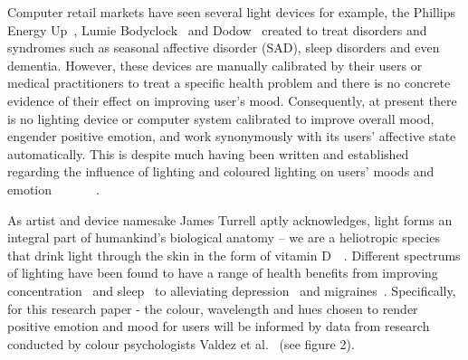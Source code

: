 \documentclass{sigchi}
\begin{document}
Computer retail markets have seen several light devices for example, the Phillips Energy Up~\cite{Phillips01}, Lumie Bodyclock~\cite{Lumie01} and Dodow~\cite{Dodow01} created to treat disorders and syndromes such as seasonal affective disorder (SAD), sleep disorders and even dementia. However, these devices are manually calibrated by their users or medical practitioners to treat a specific health problem and there is no concrete evidence of their effect on improving user’s mood. Consequently, at present there is no lighting device or computer system calibrated to improve overall mood, engender positive emotion, and work synonymously with its users’ affective state automatically. This is despite much having been written and established regarding the influence of lighting and coloured lighting on users’ moods and emotion~\cite{baron1992effects}~\cite{han2017effects}~\cite{jo2014smart}~\cite{kim2014study}~\cite{lee2019effects}~\cite{wardono2012effects}~\cite{yang2015lighting}. 

As artist and device namesake James Turrell aptly acknowledges, light forms an integral part of humankind’s biological anatomy – we are a heliotropic species that drink light through the skin in the form of vitamin D~\cite{adcock1990james}~\cite{basse2016light}. Different spectrums of lighting have been found to have a range of health benefits from improving concentration~\cite{kuller2006impact} and sleep~\cite{} to alleviating depression~\cite{kripke1998light} and migraines~\cite{Green01}. Specifically, for this research paper - the colour, wavelength and hues chosen to render positive emotion and mood for users will be informed by data from research conducted by colour psychologists Valdez et al.~\cite{valdez1994effects} (see figure 2). 
\end{document}
